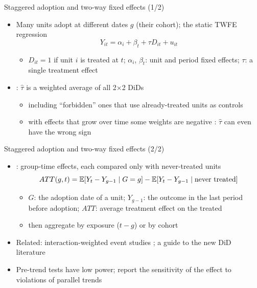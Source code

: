 \begin{frame}{Staggered adoption and two-way fixed effects (1/2)}
\itemsize{\small}
\begin{itemize}
    \item Many units adopt at different dates $g$ (their cohort); the static TWFE regression \[ Y_{it} = \alpha_i + \beta_t + \tau D_{it} + u_{it} \]
    \begin{itemize}
        \item $D_{it} = 1$ if unit $i$ is treated at $t$; $\alpha_i$, $\beta_t$: unit and period fixed effects; $\tau$: a single treatment effect
    \end{itemize}
    \item {}: $\hat\tau$ is a weighted average of all 2$\times$2 DiDs
    \begin{itemize}
        \item including ``forbidden'' ones that use already-treated units as controls
        \item with effects that grow over time some weights are negative : $\hat\tau$ can even have the wrong sign
    \end{itemize}
\end{itemize}
\end{frame}

\begin{frame}{Staggered adoption and two-way fixed effects (2/2)}
\itemsize{\small}
\begin{itemize}
    \item {}: group-time effects, each compared only with never-treated units \[ ATT(g, t) = \mathbb{E}[Y_t - Y_{g-1}\mid G = g] - \mathbb{E}[Y_t - Y_{g-1}\mid \text{never treated}] \]
    \begin{itemize}
        \item $G$: the adoption date of a unit; $Y_{g-1}$: the outcome in the last period before adoption; $ATT$: average treatment effect on the treated
        \item then aggregate by exposure ($t - g$) or by cohort
    \end{itemize}
    \item Related: interaction-weighted event studies ; a guide to the new DiD literature 
    \item Pre-trend tests have low power; report the sensitivity of the effect to violations of parallel trends
\end{itemize}
\end{frame}

